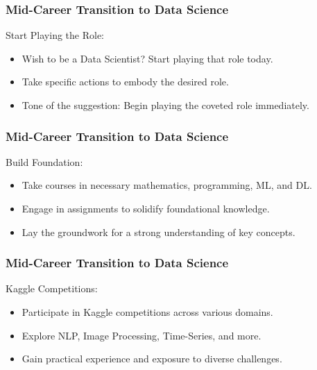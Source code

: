 \begin{frame}[fragile]\frametitle{Mid-Career Transition to Data Science}

Start Playing the Role:
        \begin{itemize}
            \item Wish to be a Data Scientist? Start playing that role today.
            \item Take specific actions to embody the desired role.
            \item Tone of the suggestion: Begin playing the coveted role immediately.
        \end{itemize}
			
\end{frame}

\begin{frame}[fragile]\frametitle{Mid-Career Transition to Data Science}

Build Foundation:
        \begin{itemize}
            \item Take courses in necessary mathematics, programming, ML, and DL.
            \item Engage in assignments to solidify foundational knowledge.
            \item Lay the groundwork for a strong understanding of key concepts.
        \end{itemize}
			
\end{frame}

\begin{frame}[fragile]\frametitle{Mid-Career Transition to Data Science}

Kaggle Competitions:
        \begin{itemize}
            \item Participate in Kaggle competitions across various domains.
            \item Explore NLP, Image Processing, Time-Series, and more.
            \item Gain practical experience and exposure to diverse challenges.
        \end{itemize}
			
\end{frame}

